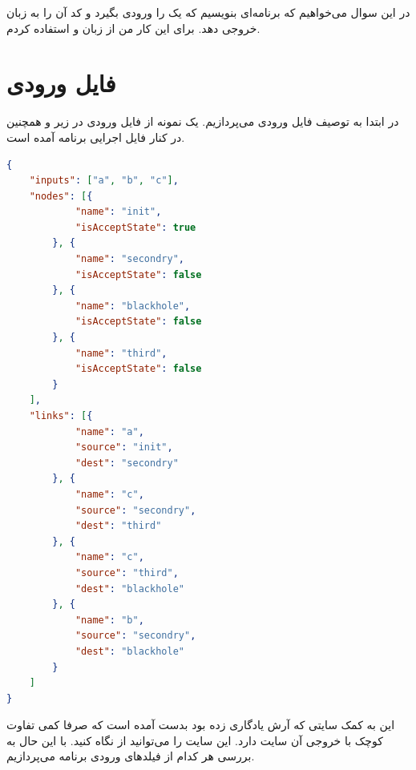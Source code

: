 \documentclass[]{article}
\begin{document}
\printheader

در این سوال می‌خواهیم که برنامه‌ای بنویسیم که یک
را ورودی بگیرد و کد
آن را به زبان
خروجی دهد. برای این کار من از زبان
 و 
استفاده کردم.

\section*{فایل ورودی}
در ابتدا به توصیف فایل ورودی می‌پردازیم. یک نمونه از فایل ورودی در زیر و همچنین در کنار فایل اجرایی
برنامه آمده است.
\begin{latin}
\begin{lstlisting}[language=json]
{
    "inputs": ["a", "b", "c"],
    "nodes": [{
            "name": "init",
            "isAcceptState": true
        }, {
            "name": "secondry",
            "isAcceptState": false
        }, {
            "name": "blackhole",
            "isAcceptState": false
        }, {
            "name": "third",
            "isAcceptState": false
        }
    ],
    "links": [{
            "name": "a",
            "source": "init",
            "dest": "secondry"
        }, {
            "name": "c",
            "source": "secondry",
            "dest": "third"
        }, {
            "name": "c",
            "source": "third",
            "dest": "blackhole"
        }, {
            "name": "b",
            "source": "secondry",
            "dest": "blackhole"
        }
    ]
}
\end{lstlisting}
\end{latin}
این
به کمک سایتی که آرش یادگاری زده بود بدست آمده است که صرفا کمی تفاوت کوچک با خروجی آن سایت دارد.
این سایت را می‌توانید از
نگاه کنید. با این حال به بررسی هر کدام از فیلد‌های
ورودی برنامه می‌پردازیم.
\end{document}
